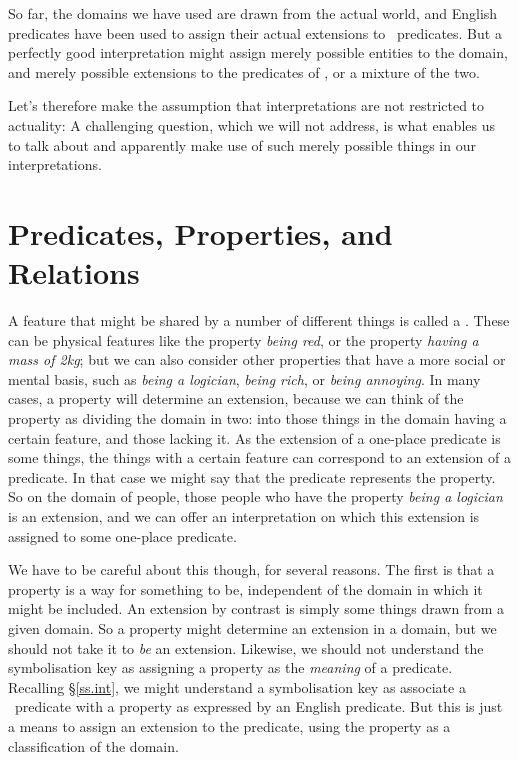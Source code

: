 So far, the domains we have used are drawn from the actual world, and English predicates have been used to assign their actual extensions to \FOL\ predicates. But a perfectly good interpretation might assign merely possible entities to the domain, and merely possible extensions to the predicates of \FOL, or a mixture of the two. 

Let's therefore make the assumption that interpretations are not restricted to actuality:  A challenging question, which we will not address, is what enables us to talk about and apparently make use of such merely possible things in our interpretations.


\section{Predicates, Properties, and Relations}\label{predrel}

A feature that might be shared by a number of different things is called a . These can be physical features like the property \emph{being red}, or the property \emph{having a mass of 2kg}; but we can also consider other properties that have a more social or mental basis, such as \emph{being a logician}, \emph{being rich}, or \emph{being annoying}. In many cases, a property will determine an extension, because we can think of the property as dividing the domain in two: into those things in the domain having a certain feature, and those lacking it. As the extension of a one-place predicate is some things, the things with a certain feature can correspond to an extension of a predicate. In that case we might say that the predicate represents the property. So on the domain of people, those people who have the property \emph{being a logician} is an extension, and we can offer an interpretation on which this extension is assigned to some one-place predicate.

We have to be careful about this though, for several reasons. The first is that a property is a way for something to be, independent of the domain in which it might be included. An extension by contrast is simply some things drawn from a given domain. So a property might determine an extension in a domain, but we should not take it to \emph{be} an extension. Likewise, we should not understand the symbolisation key as assigning a property as the \emph{meaning} of a predicate. Recalling §\ref{ss.int}, we might understand a symbolisation key as associate a \FOL\ predicate with a property as expressed by an English predicate. But this is just a means to assign an extension to the predicate, using the property as a classification of the domain. 

